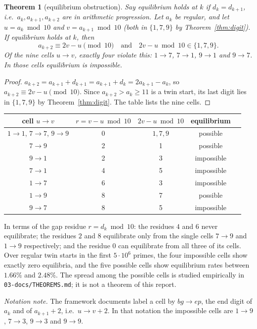 \documentclass[11pt]{article}
\theoremstyle{plain}
\newtheorem{theorem}{Theorem}
\theoremstyle{definition}
\theoremstyle{remark}
\begin{document}
\begin{theorem}[equilibrium obstruction]\label{thm:eq}
Say equilibrium holds at $k$ if $d_k=d_{k+1}$, i.e.\ $a_k,a_{k+1},a_{k+2}$ are in arithmetic
progression. Let $a_k$ be regular, and let $u=a_k\bmod10$ and $v=a_{k+1}\bmod10$ (both in
$\{1,7,9\}$ by Theorem~\ref{thm:digit}). If equilibrium holds at $k$, then
\[
a_{k+2}\equiv 2v-u\pmod{10}\quad\text{and}\quad 2v-u\bmod 10\in\{1,7,9\}.
\]
Of the nine cells $u\to v$, exactly four violate this: $1\to7$, $7\to1$, $9\to1$ and $9\to7$. In
those cells equilibrium is impossible.
\end{theorem}
\begin{proof}
$a_{k+2}=a_{k+1}+d_{k+1}=a_{k+1}+d_k=2a_{k+1}-a_k$, so $a_{k+2}\equiv2v-u\pmod{10}$. Since
$a_{k+2}>a_k\ge11$ is a twin start, its last digit lies in $\{1,7,9\}$ by Theorem~\ref{thm:digit}.
The table lists the nine cells.
\end{proof}

\begin{center}
\begin{tabular}{@{}ccccl@{}}
\toprule
cell $u\to v$ & $r=v-u \bmod 10$ & $2v-u\bmod10$ & equilibrium & \\
\midrule
$1\to1$, $7\to7$, $9\to9$ & 0 & $1,7,9$ & possible & \\
$7\to9$ & 2 & 1 & possible & \\
$9\to1$ & 2 & 3 & impossible & \\
$7\to1$ & 4 & 5 & impossible & \\
$1\to7$ & 6 & 3 & impossible & \\
$1\to9$ & 8 & 7 & possible & \\
$9\to7$ & 8 & 5 & impossible & \\
\bottomrule
\end{tabular}
\end{center}

\noindent
In terms of the gap residue $r=d_k\bmod10$: the residues $4$ and $6$ never equilibrate; the residues
$2$ and $8$ equilibrate only from the single cells $7\to9$ and $1\to9$ respectively; and the residue
$0$ can equilibrate from all three of its cells. Over regular twin starts in the first $5\cdot10^6$
primes, the four impossible cells show exactly zero equilibria, and the five possible cells show
equilibrium rates between $1.66\%$ and $2.48\%$. The spread among the possible cells is studied
empirically in \texttt{03-docs/THEOREMS.md}; it is not a theorem of this report.

\noindent\emph{Notation note.} The framework documents label a cell by $bg\to ep$, the end digit of
$a_k$ and of $a_{k+1}+2$, i.e.\ $u\to v+2$. In that notation the impossible cells are
$1\to9$, $7\to3$, $9\to3$ and $9\to9$.
\end{document}
